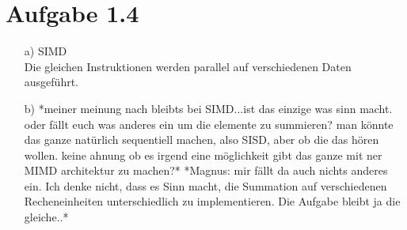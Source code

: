 \documentclass[a4paper,
               12pt,
               titlepage,
               BCOR12mm,
               ]{scrartcl}
\begin{document}
  \section*{Aufgabe 1.4}

    \begin{itemize}
      \item [a)] SIMD \\ Die gleichen Instruktionen werden parallel auf verschiedenen Daten ausgeführt.
      \item [b)] *meiner meinung nach bleibts bei SIMD...ist das einzige was sinn macht. oder fällt euch was anderes ein um die elemente zu summieren? man könnte das ganze natürlich sequentiell machen, also SISD, aber ob die das hören wollen. keine ahnung ob es irgend eine möglichkeit gibt das ganze mit ner MIMD architektur zu machen?*
				*Magnus: mir fällt da auch nichts anderes ein. Ich denke nicht, dass es Sinn
				macht, die Summation auf verschiedenen Recheneinheiten unterschiedlich zu
				implementieren. Die Aufgabe bleibt ja die gleiche..*
    \end{itemize}

		\nocite{*}
		
		
\end{document}
